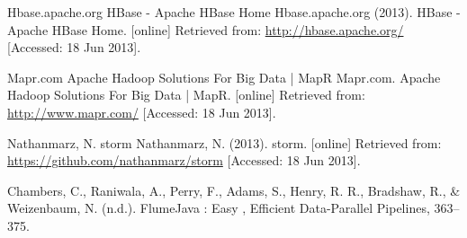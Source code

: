 \documentclass{article}
\begin{document}
\begin{thebibliography}{99}
     Hbase.apache.org
        HBase - Apache HBase Home
        Hbase.apache.org (2013). HBase - Apache HBase Home. [online]
        Retrieved from: \url{http://hbase.apache.org/} [Accessed: 18 Jun 2013].

     Mapr.com
        Apache Hadoop Solutions For Big Data | MapR
        Mapr.com. Apache Hadoop Solutions For Big Data | MapR. [online]
        Retrieved from: \url{http://www.mapr.com/} [Accessed: 18 Jun 2013].

     Nathanmarz, N.
        storm
        Nathanmarz, N. (2013). storm. [online] Retrieved from:
        \url{https://github.com/nathanmarz/storm} [Accessed: 18 Jun 2013].

     Chambers, C., Raniwala, A., Perry, F., Adams, S., Henry, R.
        R., Bradshaw, R., \& Weizenbaum, N. (n.d.). FlumeJava : Easy , Efficient
        Data-Parallel Pipelines, 363–375.
\end{thebibliography}
\end{document}
